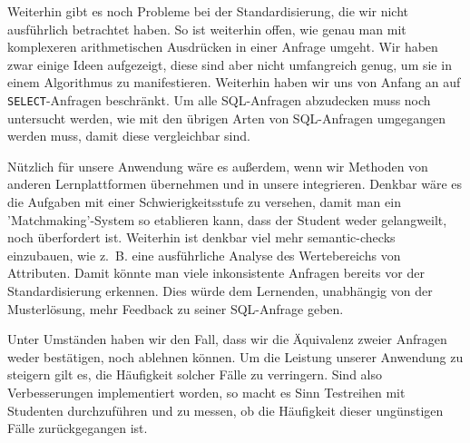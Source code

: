 Weiterhin gibt es noch Probleme bei der Standardisierung, die wir nicht ausführlich betrachtet haben. So ist weiterhin offen, wie genau man mit komplexeren arithmetischen Ausdrücken in einer Anfrage umgeht. Wir haben zwar einige Ideen aufgezeigt, diese sind aber nicht umfangreich genug, um sie in einem Algorithmus zu manifestieren. Weiterhin haben wir uns von Anfang an auf \verb|SELECT|-Anfragen beschränkt. Um alle SQL-Anfragen abzudecken muss noch untersucht werden, wie mit den übrigen Arten von SQL-Anfragen umgegangen werden muss, damit diese vergleichbar sind. 

Nützlich für unsere Anwendung wäre es außerdem, wenn wir Methoden von anderen Lernplattformen übernehmen und in unsere integrieren. Denkbar wäre es die Aufgaben mit einer Schwierigkeitsstufe zu versehen, damit man ein 'Matchmaking'-System so etablieren kann, dass der Student weder gelangweilt, noch überfordert ist. Weiterhin ist denkbar viel mehr semantic-checks einzubauen, wie \mbox{z. B.} eine ausführliche Analyse des Wertebereichs von Attributen. Damit könnte man viele inkonsistente Anfragen bereits vor der Standardisierung erkennen. Dies würde dem Lernenden, unabhängig von der Musterlösung, mehr Feedback zu seiner SQL-Anfrage geben. 

Unter Umständen haben wir den Fall, dass wir die Äquivalenz zweier Anfragen weder bestätigen, noch ablehnen können. Um die Leistung unserer Anwendung zu steigern gilt es, die Häufigkeit solcher Fälle zu verringern. Sind also Verbesserungen implementiert worden, so macht es Sinn Testreihen mit Studenten durchzuführen und zu messen, ob die Häufigkeit dieser ungünstigen Fälle zurückgegangen ist.

